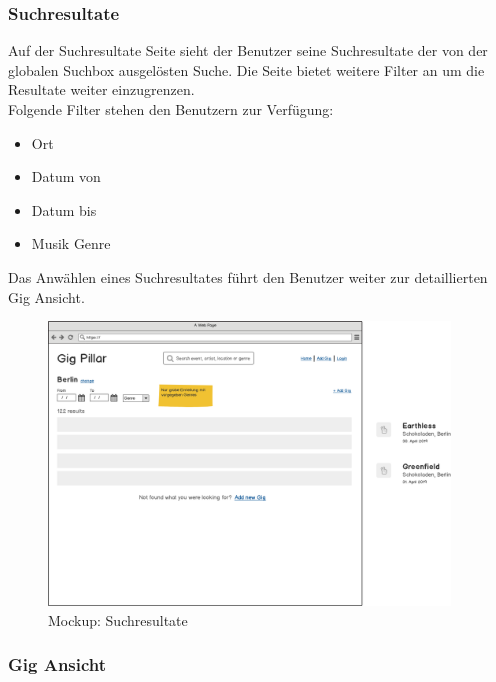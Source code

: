 \clearpage
\subsubsection{Suchresultate}

Auf der Suchresultate Seite sieht der Benutzer seine Suchresultate der von der
globalen Suchbox ausgelösten Suche. Die Seite bietet weitere Filter an um die
Resultate weiter einzugrenzen.\\

\noindent
Folgende Filter stehen den Benutzern zur Verfügung:


\begin{itemize}
  \tightlist{}
  \item{} Ort
  \item{} Datum von
  \item{} Datum bis
  \item{} Musik Genre
\end{itemize}

\noindent
Das Anwählen eines Suchresultates führt den Benutzer weiter zur detaillierten
Gig Ansicht.

\begin{figure}[!htb]
  \centering
  \includegraphics[width=0.95\textwidth]{mockups/search-result.png}
  \caption{Mockup: Suchresultate}
\end{figure}

\clearpage
\subsubsection{Gig Ansicht}

